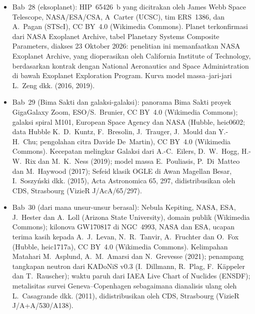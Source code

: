 \begin{itemize}
  \item Bab~28 (eksoplanet): HIP~65426~b yang dicitrakan oleh James Webb Space Telescope, NASA/ESA/CSA, A~Carter (UCSC), tim ERS~1386, dan A.~Pagan (STScI), CC BY~4.0 (Wikimedia Commons). Planet terkonfirmasi dari NASA Exoplanet Archive, tabel Planetary Systems Composite Parameters, diakses 23 Oktober 2026: penelitian ini memanfaatkan NASA Exoplanet Archive, yang dioperasikan oleh California Institute of Technology, berdasarkan kontrak dengan National Aeronautics and Space Administration di bawah Exoplanet Exploration Program. Kurva model massa--jari-jari L.~Zeng dkk. (2016, 2019).
  \item Bab~29 (Bima Sakti dan galaksi-galaksi): panorama Bima Sakti proyek GigaGalaxy Zoom, ESO/S.~Brunier, CC BY~4.0 (Wikimedia Commons); galaksi spiral M101, European Space Agency dan NASA (Hubble, heic0602; data Hubble K.~D.~Kuntz, F.~Bresolin, J.~Trauger, J.~Mould dan Y.-H.~Chu; pengolahan citra Davide De~Martin), CC BY~4.0 (Wikimedia Commons). Kecepatan melingkar Galaksi dari A.-C.~Eilers, D.~W.~Hogg, H.-W.~Rix dan M.~K.~Ness (2019); model massa E.~Pouliasis, P.~Di~Matteo dan M.~Haywood (2017); Sefeid klasik OGLE di Awan Magellan Besar, I.~Soszy\'nski dkk. (2015), Acta Astronomica 65, 297, didistribusikan oleh CDS, Strasbourg (VizieR J/AcA/65/297).
  \item Bab~30 (dari mana unsur-unsur berasal): Nebula Kepiting, NASA, ESA, J.~Hester dan A.~Loll (Arizona State University), domain publik (Wikimedia Commons); kilonova GW170817 di NGC~4993, NASA dan ESA, ucapan terima kasih kepada A.~J.~Levan, N.~R.~Tanvir, A.~Fruchter dan O.~Fox (Hubble, heic1717a), CC BY~4.0 (Wikimedia Commons). Kelimpahan Matahari M.~Asplund, A.~M.~Amarsi dan N.~Grevesse (2021); penampang tangkapan neutron dari KADoNiS v0.3 (I.~Dillmann, R.~Plag, F.~K\"appeler dan T.~Rauscher); waktu paruh dari IAEA Live Chart of Nuclides (ENSDF); metalisitas survei Geneva--Copenhagen sebagaimana dianalisis ulang oleh L.~Casagrande dkk. (2011), didistribusikan oleh CDS, Strasbourg (VizieR J/A+A/530/A138).
\end{itemize}
